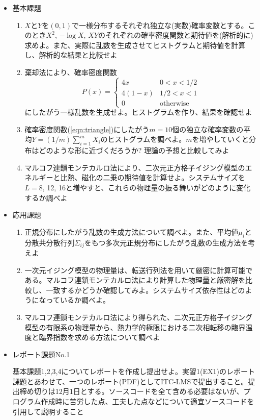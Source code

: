 \documentclass[11pt]{jarticle}
\begin{document}
\begin{itemize}
\item 基本課題
  \begin{enumerate}
  \item $X$と$Y$を$(0,1)$で一様分布するそれぞれ独立な(実数)確率変数とする。このとき$X^2$, $-\log X$, $XY$のそれぞれの確率密度関数と期待値を(解析的に)求めよ。また、実際に乱数を生成させてヒストグラムと期待値を計算し、解析的な結果と比較せよ
  \item 棄却法により、確率密度関数
    \begin{equation}
      P(x) = \begin{cases} 4x & 0 < x < 1/2 \\
        4(1-x) & 1/2 < x < 1 \\
        0 & \text{otherwise}
      \end{cases}
      \label{eqn:triangle}
    \end{equation}
    にしたがう一様乱数を生成せよ。ヒストグラムを作り、結果を確認せよ
  \item 確率密度関数(\ref{eqn:triangle})にしたがう$m=10$個の独立な確率変数の平均$Y=(1/m) \sum_{i=1}^m X_i$のヒストグラムを調べよ。$m$を増やしていくと分布はどのような形に近づくだろうか? 理論の予想と比較してみよ
  \item マルコフ連鎖モンテカルロ法により、二次元正方格子イジング模型のエネルギーと比熱、磁化の二乗の期待値を計算せよ。システムサイズを$L=8$, 12, 16と増やすと、これらの物理量の振る舞いがどのように変化するか調べよ
  \end{enumerate}  
\item 応用課題
  \begin{enumerate}
  \item 正規分布にしたがう乱数の生成方法について調べよ。また、平均値$\mu_i$と分散共分散行列$\Sigma_{ij}$をもつ多次元正規分布にしたがう乱数の生成方法を考えよ
  \item 一次元イジング模型の物理量は、転送行列法を用いて厳密に計算可能である。マルコフ連鎖モンテカルロ法により計算した物理量と厳密解を比較し、一致するかどうか確認してみよ。システムサイズ依存性はどのようになっているか調べよ。
  \item マルコフ連鎖モンテカルロ法により得られた、二次元正方格子イジング模型の有限系の物理量から、熱力学的極限における二次相転移の臨界温度と臨界指数を求める方法について調べよ
  \end{enumerate}

\item レポート課題No.1

  基本課題1,2,3,4についてレポートを作成し提出せよ。実習1(EX1)のレポート課題とあわせて、一つのレポート(PDF)としてITC-LMSで提出すること。提出締め切りは12月1日とする。ソースコードを全て含める必要はないが、プログラム作成時に苦労した点、工夫した点などについて適宜ソースコードを引用して説明すること
\end{itemize}
\end{document}
